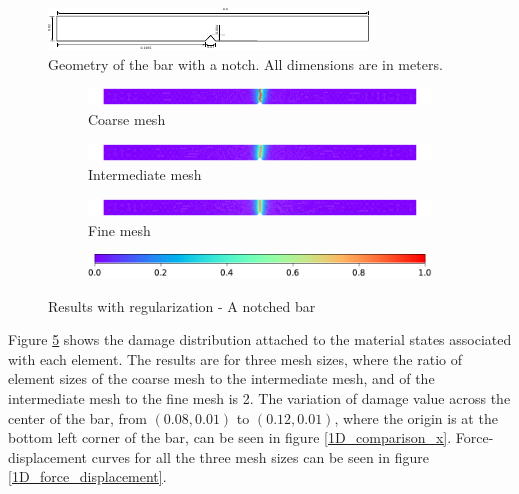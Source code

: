 \documentclass[10pt]{elsarticle}
\begin{document}
\begin{figure}
	\centering
	\includegraphics[width=\linewidth]{./Images/2d_1d_bar/2d_1d_bar.pdf}
	\caption{Geometry of the bar with a notch. All dimensions are in meters.}
	\label{2d_1d_bar_dims}
\end{figure}


\begin{figure}[ht]
	\begin{subfigure}{\textwidth}
		\centering
		\includegraphics[width=\linewidth]{./Images/2d_1d_bar/damage_coarse.pdf}
		\caption{Coarse mesh}
		\label{2d_1d_bar_damage_coarse}
	\end{subfigure}
	\begin{subfigure}{\textwidth}
		\centering
		\includegraphics[width=\linewidth]{./Images/2d_1d_bar/damage_inter.pdf}
		\caption{Intermediate mesh}
		\label{2d_1d_bar_damage_inter}
	\end{subfigure}
	\begin{subfigure}{\textwidth}
		\centering
		\includegraphics[width=\linewidth]{./Images/2d_1d_bar/damage_fine.pdf}
		\caption{Fine mesh}
		\label{2d_1d_bar_damage_fine}
	\end{subfigure}
	\begin{subfigure}{\textwidth}
		\centering
		\vfill
		\includegraphics[width=0.4\linewidth]{./Images/2d_1d_bar/cb.pdf}
	\end{subfigure}
	\caption{Results with regularization - A notched bar}
	\label{2d_1d_bar_damage}
\end{figure}

Figure \ref{2d_1d_bar_damage} shows the damage distribution attached to the material states associated with each element. The results are for three mesh sizes, where the ratio of element sizes of the coarse mesh to the intermediate mesh, and of the intermediate mesh to the fine mesh is 2. The variation of damage value across the center of the bar, from $(0.08,0.01)$ to $(0.12,0.01)$, where the origin is at the bottom left corner of the bar, can be seen in figure \ref{1D_comparison_x}. Force-displacement curves for all the three mesh sizes can be seen in figure \ref{1D_force_displacement}. 
\end{document}
